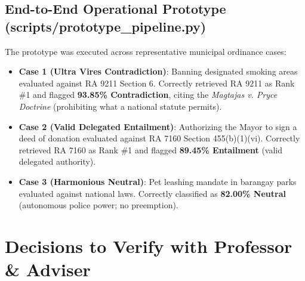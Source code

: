 \documentclass[10pt,letterpaper]{article}
\begin{document}
\subsection{End-to-End Operational Prototype (scripts/prototype\_pipeline.py)}
The prototype was executed across representative municipal ordinance cases:
\begin{itemize}
    \item \textbf{Case 1 (Ultra Vires Contradiction)}: Banning designated smoking areas evaluated against RA 9211 Section 6. Correctly retrieved RA 9211 as Rank \#1 and flagged \textbf{93.85\% Contradiction}, citing the \textit{Magtajas v. Pryce Doctrine} (prohibiting what a national statute permits).
    \item \textbf{Case 2 (Valid Delegated Entailment)}: Authorizing the Mayor to sign a deed of donation evaluated against RA 7160 Section 455(b)(1)(vi). Correctly retrieved RA 7160 as Rank \#1 and flagged \textbf{89.45\% Entailment} (valid delegated authority).
    \item \textbf{Case 3 (Harmonious Neutral)}: Pet leashing mandate in barangay parks evaluated against national laws. Correctly classified as \textbf{82.00\% Neutral} (autonomous police power; no preemption).
\end{itemize}

\section{Decisions to Verify with Professor \& Adviser}
\end{document}
